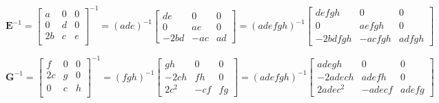 \documentclass{article}
\begin{document}
\begin{equation}
    \mathbf{E}^{-1}=
    \begin{bmatrix}
a &0 &0  \\
0 &d &0  \\
2b &c &e  \\
\end{bmatrix}^{-1}
=(ade)^{-1}
    \begin{bmatrix}
        de &0 &0 \\
        0 &ae &0 \\
        -2bd &-ac & ad
    \end{bmatrix}
=(adefgh)^{-1}
    \begin{bmatrix}
        defgh &0 &0 \\
        0 &aefgh &0 \\
        -2bdfgh &-acfgh & adfgh
    \end{bmatrix}
\end{equation}

\begin{equation}
    \mathbf{G}^{-1}=
    \begin{bmatrix}
f &0 &0 \\
2c &g &0 \\
0 &c &h \\
\end{bmatrix}^{-1}
= (fgh)^{-1} \begin{bmatrix}
        gh  &0  &0 \\
        -2ch  &fh   &0\\
        2c^2 &-cf &fg
    \end{bmatrix}
=(adefgh)^{-1}
\begin{bmatrix}
        adegh  &0  &0 \\
        -2adech  &adefh   &0\\
        2adec^2 &-adecf &adefg
    \end{bmatrix}
\end{equation}
\end{document}
